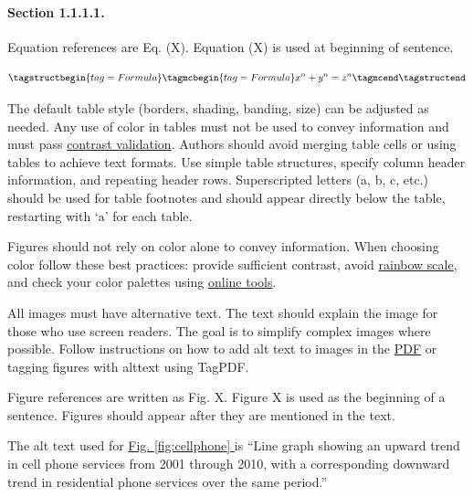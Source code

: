 \paragraph{Section 1.1.1.1.}
\tagmcend
 \tagstructend
 \tagpdfparaOn
Equation references are Eq. (X). Equation (X) is used at beginning of sentence.
 
\tagpdfparaOff 
\begin{equation}
\tagstructbegin{tag=Formula}
 \tagmcbegin{tag=Formula}
\label{eq:example}
{x}^{n} + {y}^{n} = {z}^{n}
\tagmcend
\tagstructend
\end{equation}

\tagpdfparaOn
 
The default table style (borders, shading, banding, size) can be adjusted as needed. Any use of color in tables must not be used to convey information and must pass \href{https://support.microsoft.com/en-us/office/make-your-content-accessible-to-everyone-with-the-accessibility-checker-38059c2d-45ef-4830-9797-618f0e96f3ab}{contrast validation}. Authors should avoid merging table cells or using tables to achieve text formats. Use simple table structures, specify column header information, and repeating header rows. Superscripted letters (a, b, c, etc.) should be used for table footnotes and should appear directly below the table, restarting with ‘a’ for each table.

Figures should not rely on color alone to convey information. When choosing color follow these best practices: provide sufficient contrast, avoid \href{https://www.nature.com/articles/519291d}{rainbow scale}, and check your color palettes using \href{http://selection.datavisualization.ch/}{online tools}.

All images must have alternative text. The text should explain the image for those who use screen readers. The goal is to simplify complex images where possible. Follow instructions on how to add alt text to images in the \href{https://helpx.adobe.com/acrobat/using/editing-document-structure-content-tags.html#add_alternate_text_and_supplementary_information_to_tags}{PDF} or tagging figures with alttext using TagPDF.

Figure references are written as Fig. X. Figure X is used as the beginning of a sentence. Figures should appear after they are mentioned in the text. 

The alt text used for \href{https://equidox.co/blog/beyond-basic-alt-text-charts-maps-and-diagrams/}{Fig. \ref{fig:cellphone} } is “Line graph showing an upward trend in cell phone services from 2001 through 2010, with a corresponding downward trend in residential phone services over the same period.” 
 


